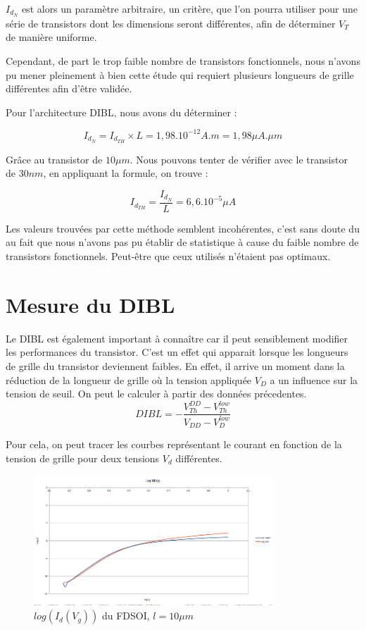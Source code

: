 \documentclass[a4paper,11pt]{report}
\begin{document}
$I_{d_{N}}$ est alors un paramètre arbitraire, un critère, que l'on pourra utiliser pour une série de transistors dont les dimensions seront différentes, afin de déterminer $V_T$ de manière uniforme.

Cependant, de part le trop faible nombre de transistors fonctionnels, nous n'avons pu mener pleinement à bien cette étude qui requiert plusieurs longueurs de grille différentes afin d'être validée.

Pour l'architecture DIBL, nous avons du déterminer :

\[I_{d_{N}}=I_{d_{TH}}\times L=1,98.10^{-12} A.m = 1,98 \mu A.\mu m\]

Grâce au transistor de $10\mu m$. Nous pouvons tenter de vérifier avec le transistor de $30nm$, en appliquant la formule, on trouve : 

\[I_{d_{TH}}=\dfrac{I_{d_{N}}}{L} = 6,6.10^{-5}\mu A\]

Les valeurs trouvées par cette méthode semblent incohérentes, c'est sans doute du au fait que nous n'avons pas pu établir de statistique à cause du faible nombre de transistors fonctionnels. Peut-être que ceux utilisés n'étaient pas optimaux.


\chapter{Mesure du DIBL}
Le DIBL est également important à connaître car il peut sensiblement modifier les performances du transistor. C'est un effet qui apparait lorsque les  longueurs de grille du transistor deviennent faibles. En effet, il arrive un moment dans la réduction de la longueur de grille où la tension appliquée $V_D$ a un influence sur la tension de seuil.
On peut le calculer à partir des données précedentes.
\[ DIBL = -\frac{V^{DD}_{Th} - V^{low}_{Th}}{V_{DD} - V^{low}_{D}}
\]

Pour cela, on peut tracer les courbes représentant le courant en fonction de la tension de grille pour deux tensions $V_d$ différentes.

\begin{figure}[h]
    \begin{center}
        \includegraphics[width=0.8\textwidth]{Images/logidvg10um}
        \caption{$log(I_d(V_g))$ du FDSOI, $l = 10\mu m$}
        \label{logidvg_fdsoi_10um}
    \end{center}
\end{figure}
\end{document}
